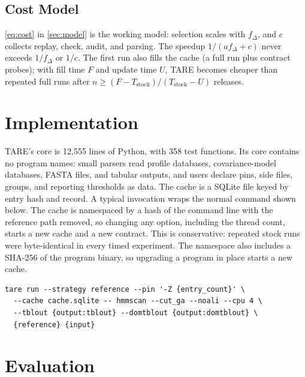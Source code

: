 \documentclass[letterpaper,twocolumn,10pt]{article}
\theoremstyle{definition}
\newcommand{\sys}{TARE\xspace}
\newcommand{\sys}{PARE\xspace}
\begin{document}
\subsection{Cost Model}
\label{sec:cost}

\cref{eq:cost} in \cref{sec:model} is the working model: selection scales with $f_\Delta$, and $c$ collects replay,
check, audit, and parsing. The speedup $1/(a f_\Delta + c)$ never exceeds $1/f_\Delta$ or $1/c$. The first run also
fills the cache (a full run plus contract probes); with fill time $F$ and update time $U$, \sys becomes cheaper than
repeated full runs after $n \ge (F - T_{\mathrm{stock}})/(T_{\mathrm{stock}} - U)$ releases.

\section{Implementation}
\label{sec:impl}

\sys's core is 12{,}555 lines of Python, with 358 test functions. Its core contains no program names: small parsers read
profile databases, covariance\nobreakdash-model databases, FASTA files, and tabular outputs, and users declare pins, side files,
groups, and reporting thresholds as data. The cache is a SQLite file keyed by entry hash and record. A typical
invocation wraps the normal command shown below. The cache is namespaced by a hash of the command line with the
reference path removed, so changing any option, including the thread count, starts a new cache and a new contract.
This is conservative: repeated stock runs were byte\nobreakdash-identical in every timed experiment. The
namespace also includes a SHA-256 of the program binary, so upgrading a program in place starts a new cache.
\begin{lstlisting}
tare run --strategy reference --pin '-Z {entry_count}' \
  --cache cache.sqlite -- hmmscan --cut_ga --noali --cpu 4 \
  --tblout {output:tblout} --domtblout {output:domtblout} \
  {reference} {input}
\end{lstlisting}

\section{Evaluation}
\label{sec:eval}
\end{document}
